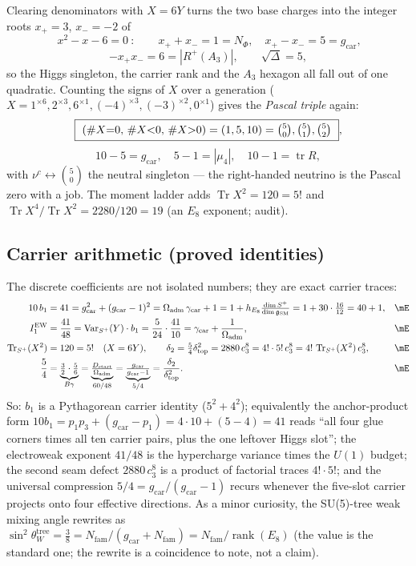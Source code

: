 \documentclass[11pt,a4paper]{article}
\newcommand{\gcar}{g_{\mathrm{car}}}
\newcommand{\Nfam}{N_{\mathrm{fam}}}
\newcommand{\Oadm}{\Omega_{\mathrm{adm}}}
\newcommand{\cthree}{c_3}
\newcommand{\dtop}{\delta_{\mathrm{top}}}
\newcommand{\dtwo}{\delta_2}
\newcommand{\dimg}{\dim\mathfrak g_{\mathrm{SM}}}
\newcommand{\Dstart}{D_{\mathrm{start}}}
\theoremstyle{definition}
\begin{document}
\begin{keybox}[The $X=6Y$ quadratic and the hypercharge Pascal-sign duality \mE]
Clearing denominators with $X=6Y$ turns the two base charges into the integer roots $x_+=3$, $x_-=-2$ of
\[
  \boxed{\ x^2-x-6=0\ }:\qquad
  x_++x_-=1=N_\Phi,\quad x_+-x_-=5=\gcar,
\]
\[
  -x_+x_-=6=|R^+(A_3)|,\qquad \sqrt{\Delta}=5,
\]
so the Higgs singleton, the carrier rank and the $A_3$ hexagon all fall out of one quadratic. Counting
the signs of $X$ over a generation ($X=1^{\times6},2^{\times3},6^{\times1},(-4)^{\times3},(-3)^{\times2},0^{\times1}$)
gives the \emph{Pascal triple} again:
\[
  \boxed{\ (\#X{=}0,\,\#X{<}0,\,\#X{>}0)=(1,5,10)=\tbinom50,\tbinom51,\tbinom52\ },
\]
\[
  10{-}5{=}\gcar,\quad 5{-}1{=}|\mu_4|,\quad 10{-}1{=}\operatorname{tr}R,
\]
with $\nu^c\leftrightarrow\binom50$ the neutral singleton --- the right-handed neutrino is the Pascal zero
with a job. The moment ladder adds $\operatorname{Tr}X^2=120=5!$ and
$\operatorname{Tr}X^4/\operatorname{Tr}X^2=2280/120=19$ (an $E_8$ exponent; audit). \mE
\end{keybox}

\subsection{Carrier arithmetic (proved identities)}

The discrete coefficients are not isolated numbers; they are exact carrier traces:
\begin{align}
  10\,b_1 &= 41 = \gcar^2+(\gcar-1)^2 = \Oadm\,\gamma_{\mathrm{car}}+1
      = 1+h_{E_8}\tfrac{\dim S^+}{\dimg} = 1+30\cdot\tfrac{16}{12} = 40+1, &&\mE\\
  I_1^{\mathrm{EW}} &= \frac{41}{48}=\operatorname{Var}_{S^+}(Y)\cdot b_1=\frac{5}{24}\cdot\frac{41}{10}
      = \gamma_{\mathrm{car}}+\frac{1}{\Oadm}, &&\mE\\
  \operatorname{Tr}_{S^+}(X^2) &= 120 = 5!\quad(X=6Y), \qquad
  \dtwo = \tfrac54\dtop^2 = 2880\,\cthree^8 = 4!\cdot 5!\,\cthree^8 = 4!\,\operatorname{Tr}_{S^+}(X^2)\,\cthree^8, &&\mE\\
  \frac54 &= \underbrace{\tfrac32\cdot\tfrac56}_{B\gamma}
      = \underbrace{\tfrac{\Dstart}{\Oadm}}_{60/48}
      = \underbrace{\tfrac{\gcar}{\gcar-1}}_{5/4}
      = \frac{\dtwo}{\dtop^2}. &&\mE
\end{align}
So: $b_1$ is a Pythagorean carrier identity ($5^2+4^2$); equivalently the anchor-product form
$10b_1=p_1p_3+(\gcar-p_1)=4\cdot10+(5-4)=41$ reads ``all four glue corners times all ten carrier pairs,
plus the one leftover Higgs slot''; the electroweak exponent $41/48$ is the
hypercharge variance times the $U(1)$ budget; the second seam defect $2880\,\cthree^8$ is a product
of factorial traces $4!\cdot5!$; and the universal compression $5/4=\gcar/(\gcar-1)$ recurs whenever
the five-slot carrier projects onto four effective directions. As a minor curiosity, the SU(5)-tree
weak mixing angle rewrites as $\sin^2\theta_W^{\mathrm{tree}}=\tfrac38=\Nfam/(\gcar+\Nfam)=\Nfam/\operatorname{rank}(E_8)$
(the value is the standard one; the rewrite is a coincidence to note, not a claim). \mC
\end{document}
